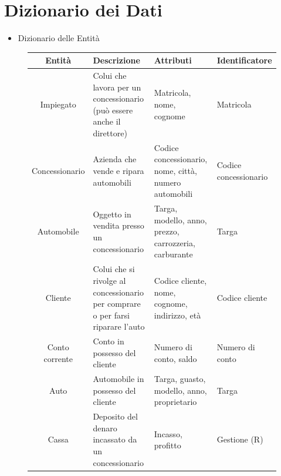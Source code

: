 \documentclass[12pt,a4paper]{article}
\begin{document}
\section{Dizionario dei Dati}
\begin{itemize}
	\item Dizionario delle Entità
\end{itemize}
\begin{figure}[H]
	\centering
\begin{tabular}{|c|p{40mm}|p{40mm}|p{30mm}|}
	\hline
	\textbf{Entità} & \textbf{Descrizione}  & \textbf{Attributi} & \textbf{Identificatore} \\
	\hline
	Impiegato & Colui che lavora per un concessionario (può essere anche il direttore) & Matricola, nome, cognome  &  Matricola \\
	\hline
	Concessionario & Azienda che vende e ripara automobili  & Codice concessionario, nome, città, numero automobili &  Codice concessionario  \\
	\hline
	Automobile & Oggetto in vendita presso un concessionario & Targa, modello, anno, prezzo, carrozzeria, carburante & Targa \\
	\hline
	Cliente  & Colui che si rivolge al concessionario per comprare o per farsi riparare l’auto & Codice cliente, nome, cognome, indirizzo, età & Codice cliente \\
	\hline
	Conto corrente & Conto in possesso del cliente & Numero di conto, saldo & Numero di conto \\
	\hline
	Auto & Automobile in possesso del cliente & Targa, guasto, modello, anno, proprietario & Targa  \\
	\hline
	Cassa & Deposito del denaro incassato da un concessionario & Incasso, profitto & Gestione (R)\\
	\hline
\end{tabular}
\end{figure}
\end{document}
